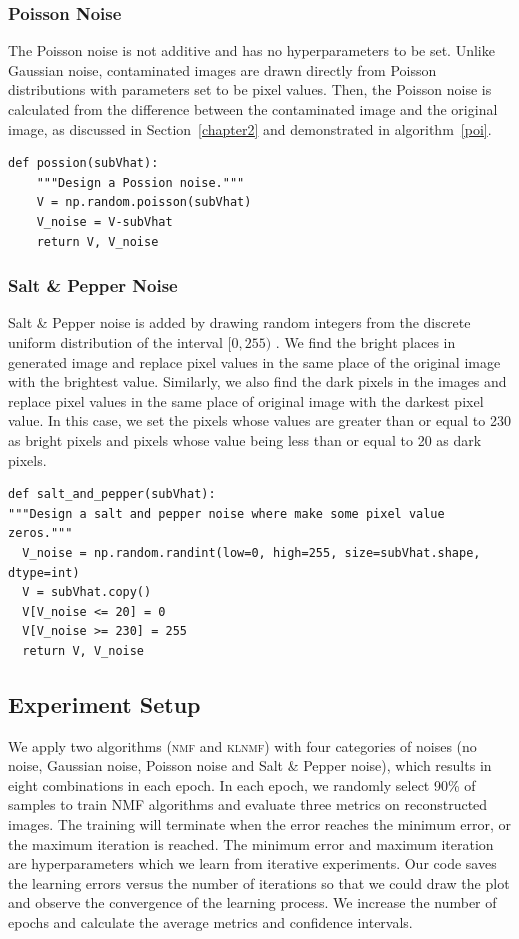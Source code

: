 \subsubsection{Poisson Noise}\label{sec:poi}
The Poisson noise is not additive and has no hyperparameters to be set. Unlike Gaussian noise, contaminated images are drawn directly from Poisson distributions with parameters set to be pixel values. Then, the Poisson noise is calculated from the difference between the contaminated image and the original image, as discussed in Section~\ref{chapter2} and demonstrated in algorithm~\ref{poi}.
\begin{lstlisting}[caption= Poisson Noise Design, label=poi]
def possion(subVhat):
    """Design a Possion noise."""
    V = np.random.poisson(subVhat)
    V_noise = V-subVhat
    return V, V_noise
\end{lstlisting}


\subsubsection{Salt \& Pepper Noise}\label{sec:sal}
Salt \& Pepper noise is added by drawing random integers from the discrete uniform distribution of the interval $[0, 255)$ . We find the bright places in generated image and replace pixel values in the same place of the original image with the brightest value. Similarly, we also find the dark pixels in the  images and replace pixel values in the same place of original image with the  darkest pixel value. In this case, we set the pixels whose values are greater than or equal to 230 as bright pixels and pixels whose value being less than or equal to 20 as dark pixels.
\begin{lstlisting}[caption= Salt and Pepper Noise Design, label=salt]
def salt_and_pepper(subVhat):
"""Design a salt and pepper noise where make some pixel value zeros."""
  V_noise = np.random.randint(low=0, high=255, size=subVhat.shape, dtype=int)
  V = subVhat.copy()
  V[V_noise <= 20] = 0
  V[V_noise >= 230] = 255
  return V, V_noise
\end{lstlisting}

\subsection{Experiment Setup}

We apply two algorithms (\textsc{nmf} and \textsc{klnmf}) with four categories of noises (no noise, Gaussian noise, Poisson noise and Salt \& Pepper noise), which results in eight combinations in each epoch. In each epoch, we randomly select 90\% of samples to train NMF algorithms and evaluate three metrics on reconstructed images. The training will terminate when the error reaches the minimum error, or the maximum iteration is reached. The minimum error and maximum iteration are hyperparameters which we learn from iterative experiments. Our code saves the learning errors versus the number of iterations so that we could draw the plot and observe the convergence of the learning process. We increase the number of epochs and calculate the average metrics and confidence intervals.


